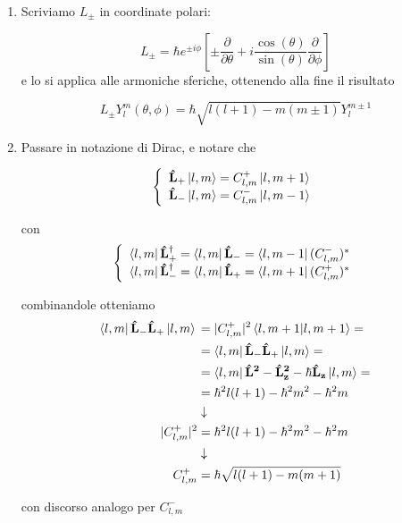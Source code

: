 \begin{enumerate}
	\item Scriviamo $L_\pm$ in coordinate polari:
	
	\begin{equation}
	L_\pm = \hbar e^{\pm i \phi} \left[
	\pm \frac{\partial}{\partial \theta} + i \frac{\cos(\theta)}{\sin(\theta)}\frac{\partial}{\partial \phi}
	\right]
	\end{equation}
	 e lo si applica alle armoniche sferiche, ottenendo alla fine il risultato
	 
	 \begin{equation}
	 L_\pm Y_l^m(\theta, \phi) = \hbar \sqrt{l(l+1) - m(m \pm 1)} Y_l^{m \pm 1}
	 \end{equation}
	
	\newpage
	
	\item Passare in notazione di Dirac, e notare che
	
	\begin{align}
	\left\{
	\begin{array}{ccc}
	\mathbf{\hat L_+} \ket{l,m} = C_{l,m}^+ \ket{l,m+1}\\
	\mathbf{\hat L_-} \ket{l,m} = C_{l,m}^- \ket{l,m-1}
	\end{array}
	\right.
		\end{align}
	
	con
	\begin{align}
		\left\{
	\begin{array}{ccc}
	\bra{l,m} \mathbf{\hat L_+^\dagger}= \bra{l,m} \mathbf{\hat L_-} =\bra{l,m-1} (C_{l,m}^-)^*\\
	\bra{l,m} \mathbf{\hat L_-^\dagger}= \bra{l,m} \mathbf{\hat L_+} =\bra{l,m+1} (C_{l,m}^+)^*
	\end{array}
	\right.
	\end{align}
	
	combinandole otteniamo
	\begin{align}
	\bra{l,m} \mathbf{\hat L_-} \mathbf{\hat L_+} \ket{l,m} {}&= |C_{l,m}^+|^2 \braket{l, m+1 | l, m+1} = \nonumber \\
	&= \bra{l,m} \mathbf{\hat L_-}\mathbf{\hat L_+} \ket{l,m}= \nonumber \\
	&= \bra{l,m} \mathbf{\hat L^2} - \mathbf{\hat L_z^2} -\hbar \mathbf{\hat L_z}  \ket{l,m}= \nonumber \\
	&= \hbar^2 l(l+1) -  \hbar^2 m^2 -  \hbar^2 m \nonumber \\
	&\downarrow \nonumber \\
	|C_{l,m}^+|^2 &= \hbar^2 l(l+1) -  \hbar^2 m^2 -  \hbar^2 m \nonumber \\
	&\downarrow \nonumber \\
	C_{l,m}^+ &= \hbar \sqrt{l(l+1) - m(m + 1)} 
	\end{align}
	
	con discorso analogo per $C_{l,m}^-$
\end{enumerate}